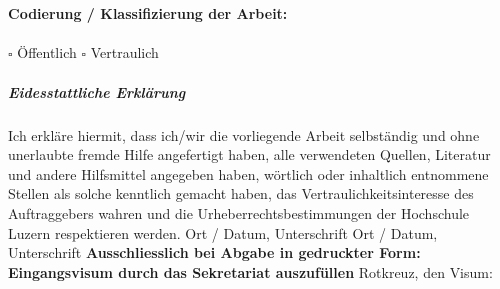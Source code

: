 \chapter*{}

\textbf{Codierung / Klassifizierung der Arbeit:}\\
\\
$\square$ \"Offentlich
$\square$ Vertraulich

\paragraph{\textbf{Eidesstattliche Erkl\"arung}}
Ich erkl\"are hiermit, dass ich/wir die vorliegende Arbeit selbst\"andig und ohne unerlaubte fremde Hilfe angefertigt haben, alle verwendeten Quellen, Literatur und andere Hilfsmittel angegeben haben, w\"ortlich oder inhaltlich entnommene Stellen als solche kenntlich gemacht haben, das Vertraulichkeitsinteresse des Auftraggebers wahren und die Urheberrechtsbestimmungen der Hochschule Luzern respektieren werden. \newline \newline
Ort / Datum, Unterschrift	\underline{\hspace*{8cm}} \newline \newline
Ort / Datum, Unterschrift	\underline{\hspace*{8cm}} \newline \newline \newline
\textbf{Ausschliesslich bei Abgabe in gedruckter Form: \\
Eingangsvisum durch das Sekretariat auszuf\"ullen}\newline \newline
Rotkreuz, den	\underline{\hspace*{4cm}}	\hspace*{1cm} Visum:	\underline{\hspace*{4cm}}
